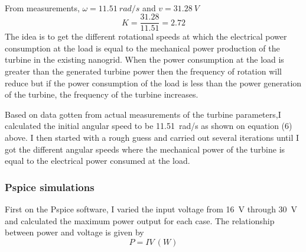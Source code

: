 \documentclass[titlepage]{article}
\begin{document}
\paragraph{}From measurements, $\omega = 11.51~rad/s$ and $ v = 31.28~V$
\begin{equation}\label{}
K = \frac{31.28}{11.51} = 2.72 
\end{equation}
The idea is to get the different rotational speeds at which the electrical power consumption at the load is equal to the mechanical power production of the turbine in the existing nanogrid. When the power consumption at the load is greater than the generated turbine power  then the frequency of rotation will reduce but if the power consumption of the load is less than the power generation of the turbine, the frequency of the turbine increases.  

Based on data gotten from actual measurements of the turbine parameters,I calculated the initial angular speed to be 11.51~rad/s as shown on equation (6) above. I then started with a rough guess and carried out several iterations until I got the different angular speeds where the mechanical power of the turbine is equal to the electrical power consumed at the load.
\subsubsection{Pspice simulations}
First on the Pspice software, I varied the input voltage from 16~V through 30~V and calculated the maximum power output for each case. The relationship between power and voltage is given by 
\begin{equation}\label{}
P = IV~(W)
\end{equation}
\end{document}

